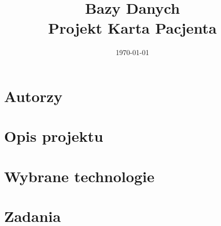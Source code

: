 \documentclass[12pt,a4paper]{article}
\begin{document}
\title{Bazy Danych\\Projekt Karta Pacjenta}
\date{\today}

\maketitle

\tableofcontents
\clearpage

\section{Autorzy}


\section{Opis projektu}


\section{Wybrane technologie}


\section{Zadania}



\end{document}

